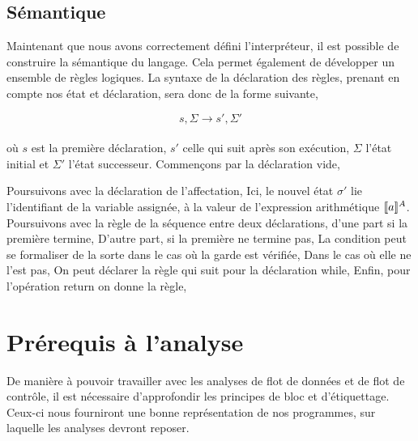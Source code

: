 \documentclass[a4paper, 10pt]{article}
\begin{document}
\subsection{Sémantique}
Maintenant que nous avons correctement défini l'interpréteur, il est possible 
de construire la sémantique du langage. Cela permet également de développer 
un ensemble de règles logiques. La syntaxe de la déclaration des règles,
prenant en compte nos état et déclaration, sera donc de la forme suivante,

\[s, \Sigma \longrightarrow s', \Sigma'\]
\\
où $s$ est la première déclaration, $s'$ celle qui suit après son exécution, 
$\Sigma$ l'état initial et $\Sigma'$  l'état successeur. Commençons 
par la déclaration vide,

\srule{ }{\semanticd{\sskip}{\sigma}{\emptyset}{\sigma}}

Poursuivons avec la déclaration de l'affectation,
Ici, le nouvel état $\sigma'$ lie l'identifiant de la variable assignée, à la 
valeur de l'expression arithmétique $[\![{a}]\!]^{A}$. Poursuivons avec la règle 
de la séquence entre deux déclarations, d'une part si la première termine,
{}
D'autre part, si la première ne termine pas,
{}
La condition peut se formaliser de la sorte dans le cas où la garde est vérifiée,
{}
Dans le cas où elle ne l'est pas,
{}
On peut déclarer la règle qui suit pour la déclaration while,
{}
Enfin, pour l'opération return on donne la règle,

\section{Prérequis à l'analyse}
De manière à pouvoir travailler avec les analyses de flot de données et de flot de contrôle, 
il est nécessaire d'approfondir les principes de bloc et d'étiquettage. Ceux-ci nous fourniront
une bonne représentation de nos programmes, sur laquelle les analyses devront reposer.
\end{document}
